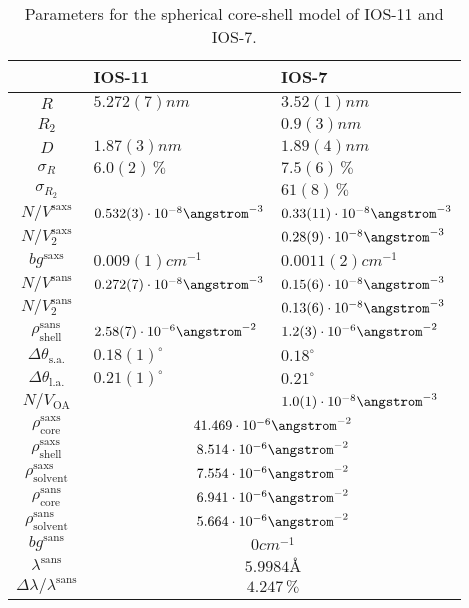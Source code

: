 \documentclass[\main/dresen_thesis.tex]{subfiles}
\begin{document}
\begin{table}[tb]
  \centering
  \caption{\label{tab:looselyPackedNP:nanoparticle:sas}Parameters for the spherical core-shell model of IOS-11 and IOS-7.}
  \begin{tabular}{ c | l | l }
      & IOS-11 & IOS-7 \\
    \hline
    $R$
      & $5.272(7) \unit{nm}$
      & $3.52(1) \unit{nm}$\\
    $R_2$
      &
      & $0.9(3) \unit{nm}$\\
    $D$
      & $1.87(3) \unit{nm}$
      & $1.89(4) \unit{nm}$\\
    $\sigma_R$
      & $6.0(2) \,\%$
      & $7.5(6) \,\%$\\
    $\sigma_{R_2}$
      &
      & $61(8) \,\%$\\
    \hline
    $N/V^\mathrm{saxs}$
      & $0.532(3) \cdot 10^{-8} \angstrom^{-3}$
      & $0.33(11) \cdot 10^{-8} \angstrom^{-3}$\\
    $N/V_2^\mathrm{saxs}$
      &
      & $0.28(9) \cdot 10^{-8} \angstrom^{-3}$\\
    $bg^\mathrm{saxs}$
      & $0.009(1) \unit{cm}^{-1}$
      & $0.0011(2) \unit{cm}^{-1}$\\
    $N/V^\mathrm{sans}$
      & $0.272(7)\cdot 10^{-8} \angstrom^{-3}$
      & $0.15(6) \cdot 10^{-8} \angstrom^{-3}$\\
    $N/V_2^\mathrm{sans}$
      &
      & $0.13(6) \cdot 10^{-8} \angstrom^{-3}$\\
    $\rho_\mathrm{shell}^\mathrm{sans}$
      & $2.58(7) \cdot 10^{-6} \angstrom^{-2}$
      & $1.2(3) \cdot 10^{-6} \angstrom^{-2}$\\
    $\Delta \theta_\mathrm{s. a.}$
      & $0.18(1) ^\circ$
      & $0.18 ^\circ$\\
    $\Delta \theta_\mathrm{l. a.}$
      & $0.21(1) ^\circ$
      & $0.21 ^\circ$\\
    $N/V_\mathrm{OA}$
      &
      & $1.0(1) \cdot 10^{-8} \angstrom^{-3}$\\
    \hline
    $\rho_\mathrm{core}^\mathrm{saxs}$
      & \multicolumn{2}{c}{$41.469 \cdot 10^{-6} \angstrom^{-2}$}\\
    $\rho_\mathrm{shell}^\mathrm{saxs}$
      & \multicolumn{2}{c}{$8.514 \cdot 10^{-6} \angstrom^{-2}$}\\
    $\rho_\mathrm{solvent}^\mathrm{saxs}$
      & \multicolumn{2}{c}{$7.554 \cdot 10^{-6} \angstrom^{-2}$}\\
    $\rho_\mathrm{core}^\mathrm{sans}$
      & \multicolumn{2}{c}{$6.941 \cdot 10^{-6} \angstrom^{-2}$}\\
    $\rho_\mathrm{solvent}^\mathrm{sans}$
      & \multicolumn{2}{c}{$5.664 \cdot 10^{-6} \angstrom^{-2}$}\\
    $bg^\mathrm{sans}$
      & \multicolumn{2}{c}{$0 \unit{cm}^{-1}$}\\
      $\lambda^\mathrm{sans}$
        & \multicolumn{2}{c}{$5.9984 \unit{\angstrom}$}\\
      $\Delta \lambda / \lambda ^\mathrm{sans}$
        & \multicolumn{2}{c}{$4.247 \, \%$}\\
    \hline
  \end{tabular}
\end{table}
\end{document}
